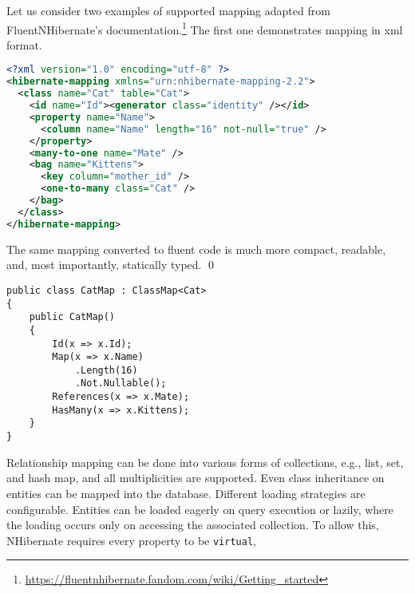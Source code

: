 \begin{example}
\small
Let us consider two examples of supported mapping adapted from FluentNHibernate's documentation.\footnote{\url{https://fluentnhibernate.fandom.com/wiki/Getting_started}} The first one demonstrates mapping in \acrshort{xml} format.

\begin{lstlisting}[language=xml]
<?xml version="1.0" encoding="utf-8" ?>  
<hibernate-mapping xmlns="urn:nhibernate-mapping-2.2">  
  <class name="Cat" table="Cat">  
    <id name="Id"><generator class="identity" /></id>  
    <property name="Name">  
      <column name="Name" length="16" not-null="true" />  
    </property> 
    <many-to-one name="Mate" />  
    <bag name="Kittens">  
      <key column="mother_id" />  
      <one-to-many class="Cat" />  
    </bag>  
  </class>  
</hibernate-mapping> 
\end{lstlisting}

The same mapping converted to fluent code is much more compact, readable, and, most importantly, statically typed. 
\qed

\begin{lstlisting}[language=CSharp]
public class CatMap : ClassMap<Cat>
{
    public CatMap()
    {
        Id(x => x.Id);
        Map(x => x.Name)
            .Length(16)
            .Not.Nullable();
        References(x => x.Mate);
        HasMany(x => x.Kittens);
    }
}
\end{lstlisting}
\end{example}

Relationship mapping can be done into various forms of collections, e.g., list, set, and hash map, and all multiplicities are supported. Even class inheritance on entities can be mapped into the database. Different loading strategies are configurable. Entities can be loaded eagerly on query execution or lazily, where the loading occurs only on accessing the associated collection. To allow this, NHibernate requires every property to be \texttt{virtual},

